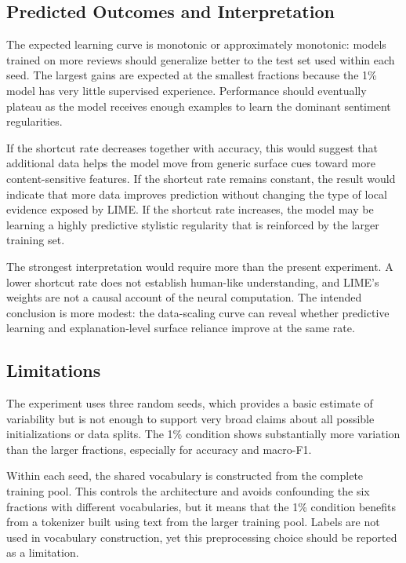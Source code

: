 \documentclass[11pt]{article}
\begin{document}
\subsection{Predicted Outcomes and Interpretation}

The expected learning curve is monotonic or approximately monotonic: models trained on more reviews should generalize better to the test set used within each seed. The largest gains are expected at the smallest fractions because the 1\% model has very little supervised experience. Performance should eventually plateau as the model receives enough examples to learn the dominant sentiment regularities.

If the shortcut rate decreases together with accuracy, this would suggest that additional data helps the model move from generic surface cues toward more content-sensitive features. If the shortcut rate remains constant, the result would indicate that more data improves prediction without changing the type of local evidence exposed by LIME. If the shortcut rate increases, the model may be learning a highly predictive stylistic regularity that is reinforced by the larger training set.

The strongest interpretation would require more than the present experiment. A lower shortcut rate does not establish human-like understanding, and LIME's weights are not a causal account of the neural computation. The intended conclusion is more modest: the data-scaling curve can reveal whether predictive learning and explanation-level surface reliance improve at the same rate.

\subsection{Limitations}

The experiment uses three random seeds, which provides a basic estimate of variability but is not enough to support very broad claims about all possible initializations or data splits. The 1\% condition shows substantially more variation than the larger fractions, especially for accuracy and macro-F1.

Within each seed, the shared vocabulary is constructed from the complete training pool. This controls the architecture and avoids confounding the six fractions with different vocabularies, but it means that the 1\% condition benefits from a tokenizer built using text from the larger training pool. Labels are not used in vocabulary construction, yet this preprocessing choice should be reported as a limitation.
\end{document}
